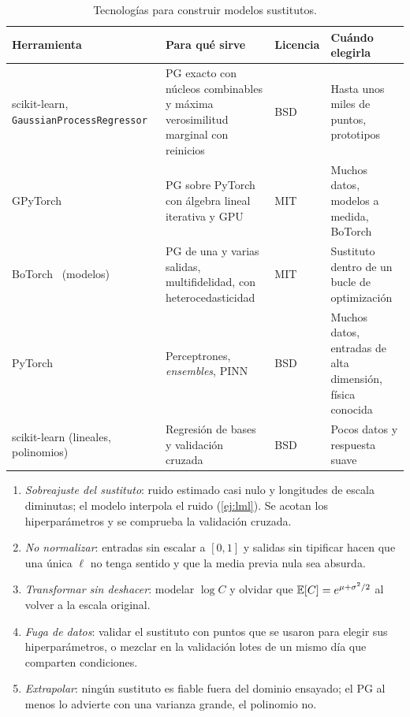 \begin{table}[ht]
\centering\small
\begin{tabularx}{\textwidth}{@{}>{\raggedright\arraybackslash}p{2.8cm}>{\raggedright\arraybackslash}X>{\raggedright\arraybackslash}p{1.6cm}>{\raggedright\arraybackslash}p{3.6cm}@{}}
\toprule
Herramienta & Para qué sirve & Licencia & Cuándo elegirla \\
\midrule
scikit-learn, \texttt{Gaussian\-Process\-Regressor}~\cite{sklearngp} & PG exacto con núcleos combinables y máxima verosimilitud marginal con reinicios & BSD & Hasta unos miles de puntos, prototipos \\
GPyTorch~\cite{gpytorch} & PG sobre PyTorch con álgebra lineal iterativa y GPU & MIT & Muchos datos, modelos a medida, BoTorch \\
BoTorch~\cite{botorch} (modelos) & PG de una y varias salidas, multifidelidad, con heterocedasticidad & MIT & Sustituto dentro de un bucle de optimización \\
PyTorch & Perceptrones, \emph{ensembles}, PINN & BSD & Muchos datos, entradas de alta dimensión, física conocida \\
scikit-learn (lineales, polinomios) & Regresión de bases y validación cruzada & BSD & Pocos datos y respuesta suave \\
\bottomrule
\end{tabularx}
\caption{Tecnologías para construir modelos sustitutos.}
\label{tab:tec3}
\end{table}

\begin{observacion}\label{obs:errores3}
\begin{enumerate}
  \item \emph{Sobreajuste del sustituto}: ruido estimado casi nulo y longitudes de escala diminutas; el modelo interpola el ruido (\cref{ej:lml}). Se acotan los hiperparámetros y se comprueba la validación cruzada.
  \item \emph{No normalizar}: entradas sin escalar a $[0,1]$ y salidas sin tipificar hacen que una única $\ell$ no tenga sentido y que la media previa nula sea absurda.
  \item \emph{Transformar sin deshacer}: modelar $\log C$ y olvidar que $\mathbb{E}[C]=e^{\mu+\sigma^2/2}$ al volver a la escala original.
  \item \emph{Fuga de datos}: validar el sustituto con puntos que se usaron para elegir sus hiperparámetros, o mezclar en la validación lotes de un mismo día que comparten condiciones.
  \item \emph{Extrapolar}: ningún sustituto es fiable fuera del dominio ensayado; el PG al menos lo advierte con una varianza grande, el polinomio no.
\end{enumerate}
\end{observacion}

